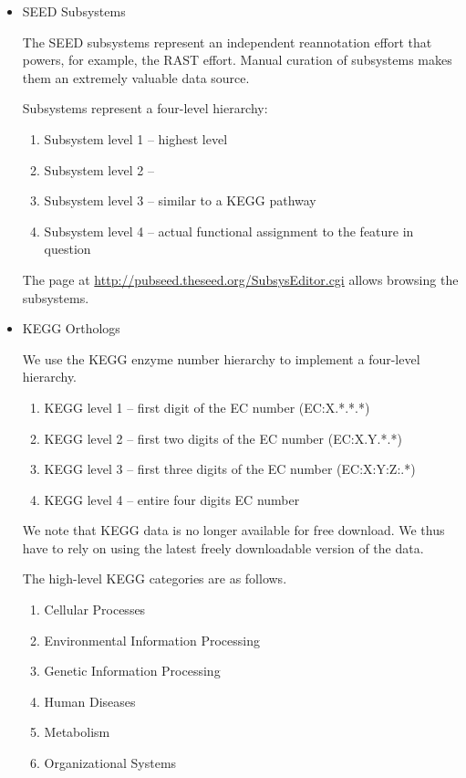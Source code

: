 \documentclass[12pt,fullpage]{report}
\begin{document}
\begin{itemize}
\item \gls{SEED} \gls{Subsystem}s

The SEED subsystems\cite{SUBSYSTEMS} represent an independent reannotation effort that powers, for example,  the RAST\cite{RAST} effort. Manual curation of subsystems makes them an extremely valuable data source.

Subsystems represent a four-level hierarchy:
\begin{enumerate}
\item Subsystem level 1 -- highest level
\item Subsystem level 2 --
\item Subsystem level 3 -- similar to a KEGG pathway
\item Subsystem level 4 -- actual functional assignment to the feature in question
\end{enumerate}

The page at \url{http://pubseed.theseed.org/SubsysEditor.cgi} allows browsing the subsystems.

\item KEGG Orthologs

We use the KEGG\cite{KEGG} enzyme number hierarchy to implement a four-level hierarchy.
\begin{enumerate}
\item KEGG level 1 -- first digit of the EC number (EC:X.*.*.*)
\item KEGG level 2 -- first two digits of the EC number (EC:X.Y.*.*)
\item KEGG level 3 -- first three digits of the EC number (EC:X:Y:Z:.*)
\item KEGG level 4 -- entire four digits EC number
\end{enumerate}

We note that KEGG data is no longer available for free download. We thus have to rely on using the latest freely downloadable version of the data.

The high-level KEGG categories are as follows.
\begin{enumerate}
\item Cellular Processes
\item Environmental Information Processing
\item Genetic Information Processing
\item Human Diseases
\item Metabolism
\item Organizational Systems
\end{enumerate}


\end{itemize}
\end{document}

